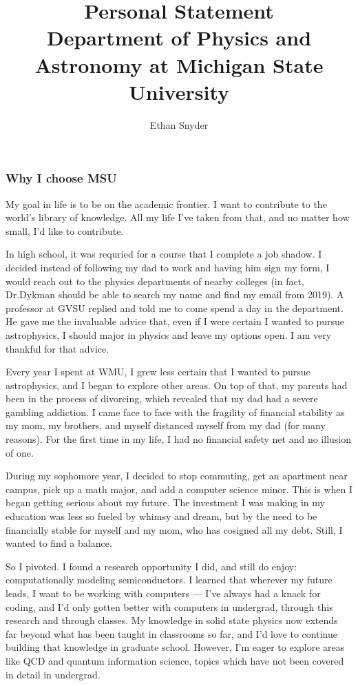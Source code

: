 \documentclass[11pt]{article}
\title{Personal Statement\\
	\large Department of Physics and Astronomy at Michigan State University}
\author{Ethan Snyder}
\begin{document}
\maketitle
\subsubsection*{Why I choose MSU}
My goal in life is to be on the academic frontier. I want to contribute to the world's library of knowledge. All my life I've taken from that, and no matter how small, I'd like to contribute.

In high school, it was requried for a course that I complete a job shadow. I decided instead of following my dad to work and having him sign my form, I would reach out to the physics departments of nearby colleges (in fact, Dr.\@ Dykman should be able to search my name and find my email from 2019). A professor at GVSU replied and told me to come spend a day in the department. He gave me the invaluable advice that, even if I were certain I wanted to pursue astrophysics, I should major in physics and leave my options open. I am very thankful for that advice.

Every year I spent at WMU, I grew less certain that I wanted to pursue astrophysics, and I began to explore other areas. On top of that, my parents had been in the process of divorcing, which revealed that my dad had a severe gambling addiction. I came face to face with the fragility of financial stability as my mom, my brothers, and myself distanced myself from my dad (for many reasons). For the first time in my life, I had no financial safety net and no illusion of one.

During my sophomore year, I decided to stop commuting, get an apartment near campus, pick up a math major, and add a computer science minor. This is when I began getting serious about my future. The investment I was making in my education was less so fueled by whimsy and dream, but by the need to be financially stable for myself and my mom, who has cosigned all my debt. Still, I wanted to find a balance.

So I pivoted. I found a research opportunity I did, and still do enjoy: computationally modeling semiconductors. I learned that wherever my future leads, I want to be working with computers --- I've always had a knack for coding, and I'd only gotten better with computers in undergrad, through this research and through classes. My knowledge in solid state physics now extends far beyond what has been taught in classrooms so far, and I'd love to continue building that knowledge in graduate school. However, I'm eager to explore areas like QCD and quantum information science, topics which have not been covered in detail in undergrad.
\end{document}
